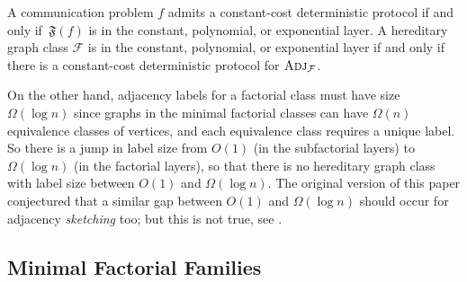\documentclass{theoretics}
\newcommand{\cF}{\ensuremath{\mathcal{F}}}
\newcommand{\Adj}{\textsc{Adj}}
\begin{document}
\begin{proposition}
A communication problem $f$ admits a constant-cost deterministic protocol if and only if $\,\mathfrak{F}(f)$ is in the constant, polynomial, or exponential layer. A hereditary graph class
$\cF$ is in the constant, polynomial, or exponential layer if and only if there is a constant-cost
deterministic protocol for $\Adj_\cF$.
\end{proposition}

On the other hand, adjacency labels for a factorial class must have size $\Omega(\log n)$ since
graphs in the minimal factorial classes can have $\Omega(n)$ equivalence classes of vertices, and
each equivalence class requires a unique label. So there is a jump in label size from $O(1)$ (in the
subfactorial layers) to $\Omega(\log n)$ (in the factorial layers), so that there is no hereditary
graph class with label size between $O(1)$ and $\Omega(\log n)$. The original version of this paper
conjectured that a similar gap between $O(1)$ and $\Omega(\log n)$ should occur for adjacency
\emph{sketching} too; but this is not true, see \cite{HHH22counter}. 

\subsection{Minimal Factorial Families}
\label{section:appendix-minimal-families}
\end{document}
